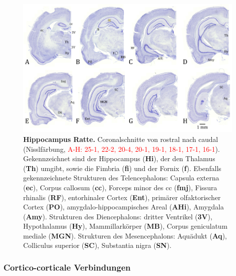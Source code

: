 \documentclass[12pt,a4paper,pdftex]{article}
\begin{document}
\begin{figure}[H]
    \centering
    \includegraphics[width=\textwidth]{pictures/Bilder_Jule/Ratte/hippocampus.png}
    \caption[Hippocampus Ratte]{\textbf{Hippocampus Ratte.} Coronalschnitte von rostral nach caudal (Nisslfärbung, \textcolor{red}{A-H: 25-1, 22-2, 20-4, 20-1, 19-1, 18-1, 17-1, 16-1}). Gekennzeichnet sind der Hippocampus (\textbf{Hi}), der den Thalamus (\textbf{Th}) umgibt, sowie die Fimbria (\textbf{fi}) und der Fornix (\textbf{f}). Ebenfalls gekennzeichnete Strukturen des Telencephalons: Capsula externa (\textbf{ec}), Corpus callosum (\textbf{cc}), Forceps minor des cc (\textbf{fmj}), Fissura rhinalis (\textbf{RF}), entorhinaler Cortex  (\textbf{Ent}), primärer olfaktorischer Cortex (\textbf{PO}), amygdalo-hippocampisches Areal (\textbf{AHi}), Amygdala (\textbf{Amy}). Strukturen des Diencephalons: dritter Ventrikel (\textbf{3V}), Hypothalamus (\textbf{Hy}), Mammillarkörper (\textbf{MB}), Corpus geniculatum mediale (\textbf{MGN}). Strukturen des Mesencephalons: Aquädukt (\textbf{Aq}), Colliculus superior (\textbf{SC}), Substantia nigra (\textbf{SN}).}
    \label{fig:hippocampus_ratte}
\end{figure}{}

\subsubsection*{Cortico-corticale Verbindungen}
\label{subsubsec:cortico-cortical}
\end{document}
